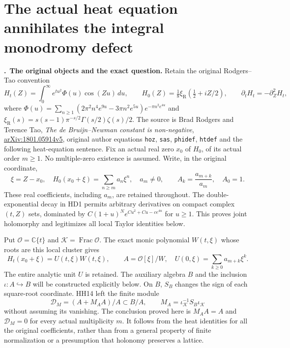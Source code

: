 \section{The actual heat equation annihilates the integral monodromy defect}
\label{sec:hd}
\newcommand{\HD}{\par\medskip\noindent\textbf{\thehd.}\ }

\HD\textbf{The original objects and the exact question.}
Retain the original Rodgers--Tao convention
\[
 H_t(Z)=\int_0^\infty e^{tu^2}\Phi(u)\cos(Zu)\,du,\qquad
 H_0(Z)=\tfrac18\xi_{\mathrm R}(\tfrac12+iZ/2),\qquad
 \partial_tH_t=-\partial_Z^2H_t,
 \tag{HD1}\label{hd:heat}
\]
where
$\Phi(u)=\sum_{n\ge1}(2\pi^2n^4e^{9u}-3\pi n^2e^{5u})
e^{-\pi n^2e^{4u}}$ and
$\xi_{\mathrm R}(s)=s(s-1)\pi^{-s/2}\Gamma(s/2)\zeta(s)/2$.
The source is Brad Rodgers and Terence Tao,
\emph{The de Bruijn--Newman constant is non-negative},
\href{https://arxiv.org/abs/1801.05914v5}{arXiv:1801.05914v5},
original author equations \texttt{hoz}, \texttt{sas},
\texttt{phidef}, \texttt{htdef} and the following heat-equation sentence.
Fix an actual real zero $x_0$ of $H_0$, of its actual order $m\ge1$.
No multiple-zero existence is assumed. Write, in the original coordinate,
\[
 \xi=Z-x_0,\quad H_0(x_0+\xi)=\sum_{n\ge m}a_n\xi^n,\quad
 a_m\ne0,\qquad A_k=\frac{a_{m+k}}{a_m},\quad A_0=1.
 \tag{HD2}
\]
These real coefficients, including $a_m$, are retained throughout.
The double-exponential decay in HD1 permits arbitrary derivatives
on compact complex $(t,Z)$ sets, dominated by
$C(1+u)^N e^{C u^2+Cu-ce^{4u}}$ for $u\ge1$.
This proves joint holomorphy and legitimizes all local Taylor
identities below.

Put $\mathcal O=\mathbb C\{t\}$ and
$\mathcal K=\operatorname{Frac}\mathcal O$.
The exact monic polynomial $W(t,\xi)$ whose roots are this local
cluster gives
\[
 H_t(x_0+\xi)=U(t,\xi)W(t,\xi),\qquad
 A=\mathcal O[\xi]/W,\quad U(0,\xi)=\sum_{k\ge0}a_{m+k}\xi^k .
 \tag{HD3}\label{hd:original}
\]
The entire analytic unit $U$ is retained.
The auxiliary algebra $B$ and the inclusion $\iota:A\hookrightarrow B$
will be constructed explicitly below. On $B$, $S_B$ changes the
sign of each square-root coordinate. HH14 left the finite module
\[
 \mathcal D_M=(A+M_AA)/A\subset B/A,\qquad
 M_A=\iota_{\mathcal K}^{-1}S_B\iota_{\mathcal K}
 \tag{HD4}\label{hd:defect}
\]
without assuming its vanishing. The conclusion proved here is
$M_AA=A$ and $\mathcal D_M=0$ for every actual multiplicity $m$.
It follows from the heat identities for all the original
coefficients, rather than from a general property of finite
normalization or a presumption that holonomy preserves a lattice.

